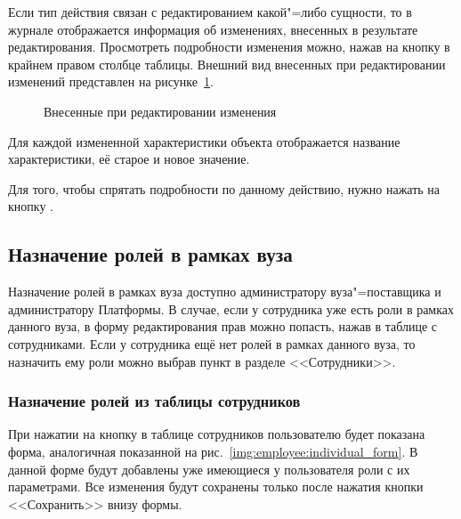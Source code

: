 Если тип действия связан с редактированием какой"=либо сущности, то в журнале отображается информация об изменениях, 
внесенных в результате редактирования. Просмотреть подробности изменения можно, 
нажав на кнопку  в крайнем правом столбце таблицы.
Внешний вид внесенных при редактировании изменений представлен на рисунке~\ref{img:employee:log_diff}.
\begin{figure}[H]
	\caption{Внесенные при редактировании изменения}
	\label{img:employee:log_diff}
\end{figure}

Для каждой измененной характеристики объекта отображается название характеристики, её старое и новое значение.


Для того, чтобы спрятать подробности по данному действию, нужно нажать на кнопку .

\subsection{Назначение ролей в рамках вуза} \label{sec:university_role}

Назначение ролей в рамках вуза доступно администратору вуза"=поставщика и администратору Платформы. В случае, если у сотрудника
уже есть роли в рамках данного вуза, в форму редактирования прав можно попасть, нажав  в 
таблице с сотрудниками. Если у сотрудника ещё нет ролей в рамках данного вуза, то назначить ему роли можно выбрав пункт 
 в разделе <<Сотрудники>>.

\subsubsection{Назначение ролей из таблицы сотрудников}

При нажатии на кнопку  в таблице сотрудников пользователю будет показана форма, 
аналогичная показанной на рис.~\ref{img:employee:individual_form}. В данной форме будут добавлены уже имеющиеся у пользователя роли
с их параметрами. Все изменения будут сохранены только после нажатия кнопки <<Сохранить>> внизу формы.

